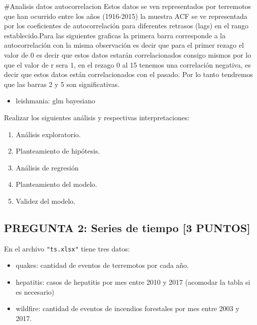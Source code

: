\documentclass[
]{article}
\providecommand{\tightlist}{%
  \setlength{\itemsep}{0pt}\setlength{\parskip}{0pt}}
\begin{document}
\#Analisis datos autocorrelacion Estos datos se ven representados por
terremotos que han ocurrido entre los años (1916-2015) la muestra ACF se
ve representada por los coeficientes de autocorrelación para diferentes
retrasos (lags) en el rango establecido.Para las siguientes graficas la
primera barra corresponde a la autocorrelación con la misma observación
es decir que para el primer rezago el valor de 0 es decir que estos
datos estarán correlacionados consigo mismos por lo que el valor de r
sera 1, en el rezago 0 al 15 tenemos una correlación negativa, es decir
que estos datos están correlacionados con el pasado. Por lo tanto
tendremos que las barras 2 y 5 son significativas.

\begin{itemize}
\tightlist
\item
  leishmania: glm bayesiano
\end{itemize}

Realizar los siguientes análisis y respectivas interpretaciones:

\begin{enumerate}
\def\labelenumi{\arabic{enumi}.}
\item
  Análisis exploratorio.
\item
  Planteamiento de hipótesis.
\item
  Análisis de regresión
\item
  Planteamiento del modelo.
\item
  Validez del modelo.
\end{enumerate}

\hypertarget{pregunta-2-series-de-tiempo-3-puntos}{%
\subsection{\texorpdfstring{\textbf{PREGUNTA 2: Series de tiempo {[}3
PUNTOS{]}}}{PREGUNTA 2: Series de tiempo {[}3 PUNTOS{]}}}\label{pregunta-2-series-de-tiempo-3-puntos}}

En el archivo \texttt{"ts.xlsx"} tiene tres datos:

\begin{itemize}
\item
  quakes: cantidad de eventos de terremotos por cada año.
\item
  hepatitis: casos de hepatitis por mes entre 2010 y 2017 (acomodar la
  tabla si es necesario)
\item
  wildfire: cantidad de eventos de incendios forestales por mes entre
  2003 y 2017.
\end{itemize}
\end{document}

